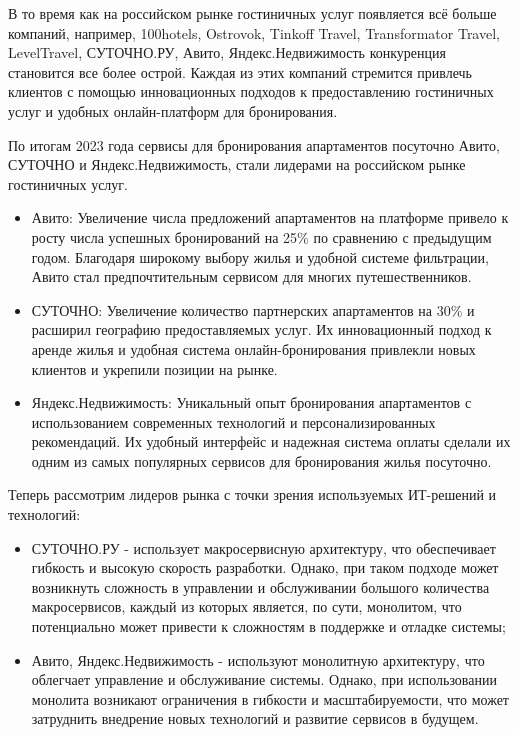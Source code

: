 В то время как на российском рынке гостиничных услуг появляется всё больше компаний, например, 100hotels, Ostrovok, Tinkoff Travel, Transformator Travel, LevelTravel, СУТОЧНО.РУ, Авито, Яндекс.Недвижимость конкуренция становится все более острой. Каждая из этих компаний стремится привлечь клиентов с помощью инновационных подходов к предоставлению гостиничных услуг и удобных онлайн-платформ для бронирования. 

По итогам 2023 года сервисы для бронирования апартаментов посуточно Авито, СУТОЧНО и Яндекс.Недвижимость, стали лидерами на российском рынке гостиничных услуг.
\begin{itemize}
    \item Авито: Увеличение числа предложений апартаментов на платформе привело к росту числа успешных бронирований на 25\% по сравнению с предыдущим годом. Благодаря широкому выбору жилья и удобной системе фильтрации, Авито стал предпочтительным сервисом для многих путешественников.

    \item СУТОЧНО: Увеличение количество партнерских апартаментов на 30\% и расширил географию предоставляемых услуг. Их инновационный подход к аренде жилья и удобная система онлайн-бронирования привлекли новых клиентов и укрепили позиции на рынке.

    \item Яндекс.Недвижимость: Уникальный опыт бронирования апартаментов с использованием современных технологий и персонализированных рекомендаций. Их удобный интерфейс и надежная система оплаты сделали их одним из самых популярных сервисов для бронирования жилья посуточно.
\end{itemize}

Теперь рассмотрим лидеров рынка с точки зрения используемых ИТ-решений и технологий:

\begin{itemize}
  \item СУТОЧНО.РУ - использует макросервисную архитектуру, что обеспечивает гибкость и высокую скорость разработки. Однако, при таком подходе может возникнуть сложность в управлении и обслуживании большого количества макросервисов, каждый из которых является, по сути, монолитом, что потенциально может привести к сложностям в поддержке и отладке системы;
  
  \item Авито, Яндекс.Недвижимость - используют монолитную архитектуру, что облегчает управление и обслуживание системы. Однако, при использовании монолита возникают ограничения в гибкости и масштабируемости, что может затруднить внедрение новых технологий и развитие сервисов в будущем.
\end{itemize}

